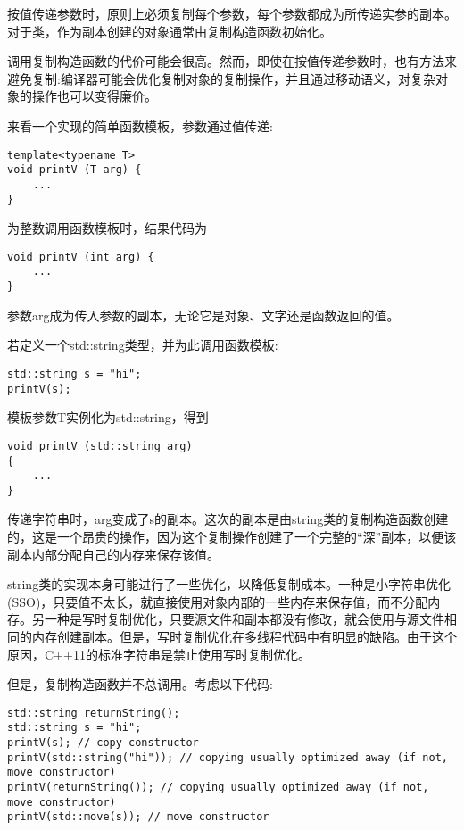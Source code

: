 按值传递参数时，原则上必须复制每个参数，每个参数都成为所传递实参的副本。对于类，作为副本创建的对象通常由复制构造函数初始化。

调用复制构造函数的代价可能会很高。然而，即使在按值传递参数时，也有方法来避免复制:编译器可能会优化复制对象的复制操作，并且通过移动语义，对复杂对象的操作也可以变得廉价。

来看一个实现的简单函数模板，参数通过值传递:

\begin{lstlisting}[style=styleCXX]
template<typename T>
void printV (T arg) {
	...
}
\end{lstlisting}

为整数调用函数模板时，结果代码为

\begin{lstlisting}[style=styleCXX]
void printV (int arg) {
	...
}
\end{lstlisting}

参数arg成为传入参数的副本，无论它是对象、文字还是函数返回的值。

若定义一个std::string类型，并为此调用函数模板:

\begin{lstlisting}[style=styleCXX]
std::string s = "hi";
printV(s);
\end{lstlisting}

模板参数T实例化为std::string，得到

\begin{lstlisting}[style=styleCXX]
void printV (std::string arg)
{
	...
}
\end{lstlisting}

传递字符串时，arg变成了s的副本。这次的副本是由string类的复制构造函数创建的，这是一个昂贵的操作，因为这个复制操作创建了一个完整的“深”副本，以便该副本内部分配自己的内存来保存该值。

\begin{tcolorbox}[colback=webgreen!5!white,colframe=webgreen!75!black]
\hspace*{0.75cm}string类的实现本身可能进行了一些优化，以降低复制成本。一种是小字符串优化(SSO)，只要值不太长，就直接使用对象内部的一些内存来保存值，而不分配内存。另一种是写时复制优化，只要源文件和副本都没有修改，就会使用与源文件相同的内存创建副本。但是，写时复制优化在多线程代码中有明显的缺陷。由于这个原因，C++11的标准字符串是禁止使用写时复制优化。
\end{tcolorbox}

但是，复制构造函数并不总调用。考虑以下代码:

\begin{lstlisting}[style=styleCXX]
std::string returnString();
std::string s = "hi";
printV(s); // copy constructor
printV(std::string("hi")); // copying usually optimized away (if not, move constructor)
printV(returnString()); // copying usually optimized away (if not, move constructor)
printV(std::move(s)); // move constructor
\end{lstlisting}

